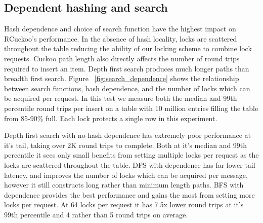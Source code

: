 \subsection{Dependent hashing and search}

Hash dependence and choice of search function have the
highest impact on RCuckoo's performance. In the absence of
hash locality, locks are scattered throughout the table
reducing the ability of our locking scheme to combine lock
requests. Cuckoo path length also directly affects the
number of round trips required to insert an item. Depth
first search produces much longer paths than breadth first
search.  Figure ~\ref{fig:search_dependence} shows the
relationship between search functions, hash dependence, and
the number of locks which can be acquired per request. In
this test we measure both the median and 99th percentile
round trips per insert on a table with 10 million entries
filling the table from 85-90\% full. Each lock protects a
single row in this experiment.

Depth first search with no hash dependence has extremely
poor performance at it's tail, taking over 2K round trips to
complete. Both at it's median and 99th percentile it sees
only small benefits from setting multiple locks per request
as the locks are scattered throughout the table. DFS with
dependence has far lower tail latency, and improves the
number of locks which can be acquired per message, however
it still constructs long rather than minimum length paths.
BFS with dependence provides the best performance and gains
the most from setting more locks per request. At 64 locks
per request it has 7.5x lower round trips at it's 99th
percentile and 4 rather than 5 round trips on average.





